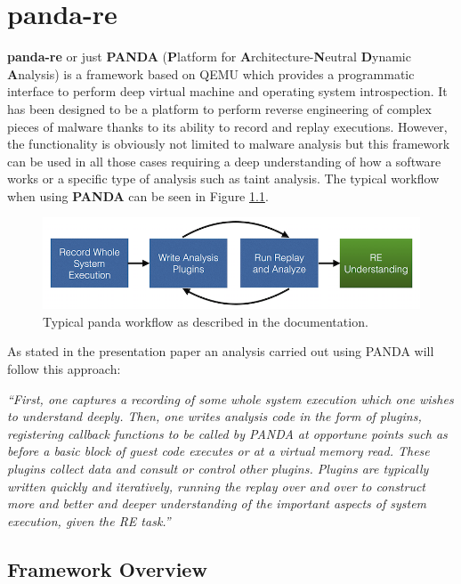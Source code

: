 \chapter{panda-re}
\label{chap:4}

\textbf{panda-re} or just \textbf{PANDA} (\textbf{P}latform  for  \textbf{A}rchitecture-\textbf{N}eutral  \textbf{D}ynamic  \textbf{A}nalysis) is a framework based on QEMU which provides a programmatic interface to perform deep virtual machine and operating system introspection. It has been designed to be a platform to perform reverse engineering of complex pieces of malware thanks to its ability to record and replay executions. However, the functionality is obviously not limited to malware analysis but this framework can be used in all those cases requiring a deep understanding of how a software works or a specific type of analysis such as taint analysis. The typical workflow when using \textbf{PANDA} can be seen in Figure \ref{fig:wkflow}.

\begin{figure}[htp]
\centering
\includegraphics[width=\linewidth]{images/panda_workflow.png}
\caption{Typical panda workflow as described in the documentation.}
\label{fig:wkflow}
\end{figure}

As stated in the presentation paper an analysis carried out using PANDA will follow this approach: 

\textit{``First, one captures a recording of some whole system execution which one wishes to understand deeply. Then, one writes analysis code in the form of plugins, registering callback functions to be called by PANDA at opportune points such as before a basic block of guest code executes or at a virtual memory read. These plugins collect data and consult or control other plugins. Plugins are typically written quickly and iteratively, running the replay over and over to construct more and better and deeper understanding of the important aspects of system execution, given the RE task.''}~\cite{panda}

\section{Framework Overview}

